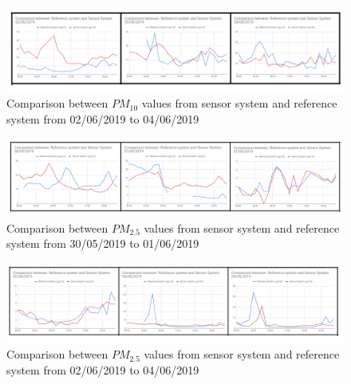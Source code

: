   
  \begin{figure}[h]
    \begin{center}
    \includegraphics[scale=0.70]{images/figure26.png}
    \end{center}
    \caption{Comparison between $PM_{10}$ values from sensor system and reference system from 02/06/2019 to 04/06/2019}
    \label{PM101}
  \end{figure}

  
  \begin{figure}[h]
    \begin{center}
    \includegraphics[scale=0.70]{images/figure27.png}
    \end{center}
    \caption{Comparison between $PM_{2.5}$ values from sensor system and reference system from 30/05/2019 to 01/06/2019}
  \label{PM2.5}
\end{figure}

\begin{figure}[h]
  \begin{center}
  \includegraphics[scale=0.70]{images/figure28.png}
  \end{center}
  \caption{Comparison between $PM_{2.5}$ values from sensor system and reference system from 02/06/2019 to 04/06/2019}
  \label{PM2.51}
\end{figure}







